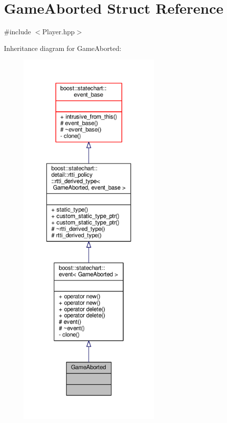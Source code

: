 \hypertarget{struct_game_aborted}{}\section{Game\+Aborted Struct Reference}
\label{struct_game_aborted}


{\ttfamily \#include $<$Player.\+hpp$>$}



Inheritance diagram for Game\+Aborted\+:
\nopagebreak
\begin{figure}[H]
\begin{center}
\leavevmode
\includegraphics[height=550pt]{struct_game_aborted__inherit__graph}
\end{center}
\end{figure}


